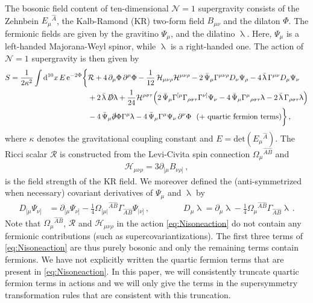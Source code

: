 \documentclass[a4paper,10pt,openany]{article}
\def\rme{\mathrm{e}}
\def\rmd{\mathrm{d}}
\begin{document}
	The bosonic field content of ten-dimensional $\mathcal{N}=1$ supergravity consists of the Zehnbein $E_\mu{}^{\hat A}$, the Kalb-Ramond (KR) two-form field $B_{\mu\nu}$ and the dilaton $\Phi$. The fermionic fields are given by the gravitino $\Psi_\mu$, and the dilatino $\uplambda$. Here, $\Psi_\mu$ is a left-handed Majorana-Weyl spinor, while $\uplambda$ is a right-handed one. The action of $\mathcal{N}=1$ supergravity is then given by
	\begin{align}
		\label{eq:Nisoneaction}
		S = \frac{1}{2\kappa^2}\int \rmd^{10}x\,E\,\rme^{-2\Phi}\bigg\{&\mathcal R+ 4\,\partial_\mu\Phi\,\partial^\mu\Phi - \frac{1}{12}\,\mathcal H_{\mu\nu\rho}\mathcal H^{\mu\nu\rho}-2\,\bar\Psi_\mu\Gamma^{\mu\nu\rho}D_\nu\Psi_\rho - 4\,\bar\uplambda\,\Gamma^{\mu\nu}D_\mu\Psi_\nu \notag\\
		& + 2\,\bar\uplambda\,\slashed D\uplambda +\frac{1}{24}\mathcal H^{\rho\sigma\tau}\Big(2\,\bar\Psi_\mu\Gamma^{[\mu}\Gamma_{\rho\sigma\tau}\Gamma^{\nu]}\Psi_\nu - 4\,\bar\Psi_\mu\Gamma^\mu{}_{\rho\sigma\tau}\uplambda - 2\,\bar\uplambda\,\Gamma_{\rho\sigma\tau}\uplambda\Big)\notag\\
		&-4\,\bar\Psi_\mu\slashed\partial\Phi\Gamma^\mu\uplambda - 4\,\bar{\Psi}_\mu\Gamma^\mu\Psi_\nu\,\partial^\nu\Phi \ \ ( + \text{ quartic fermion terms})\bigg\}\,,
	\end{align}
	where $\kappa$ denotes the gravitational coupling constant and $E = \mathrm{det}(E_\mu{}^{\hat{A}})$. The Ricci scalar $\mathcal{R}$ is constructed from the Levi-Civita spin connection $\Omega_\mu{}^{\hat{A}\hat{B}}$ and
	\begin{align}
		\label{eq:defH}
		\mathcal{H}_{\mu\nu\rho} = 3 \partial_{[\mu} B_{\nu\rho]} \,,
	\end{align}
	is the field strength of the KR field. We moreover defined the (anti-symmetrized when necessary) covariant derivatives of $\Psi_\mu$ and $\uplambda$ by
	\begin{align}
		D_{[\mu} \Psi_{\nu]} &= \partial_{[\mu} \Psi_{\nu]} - \frac14 \Omega_{[\mu|}{}^{\hat{A}\hat{B}} \Gamma_{\hat{A} \hat{B}} \Psi_{|\nu]} \,, \qquad \qquad D_\mu \uplambda = \partial_\mu \uplambda - \frac14 \Omega_{\mu}{}^{\hat{A}\hat{B}} \Gamma_{\hat{A} \hat{B}} \uplambda \,.
	\end{align}
	Note that $\Omega_\mu{}^{\hat{A}\hat{B}}$, $\mathcal{R}$ and $\mathcal{H}_{\mu\nu\rho}$ in the action \eqref{eq:Nisoneaction} do not contain any fermionic contributions (such as supercovariantizations). The first three terms of \eqref{eq:Nisoneaction} are thus purely bosonic and only the remaining terms contain fermions. We have not explicitly written the quartic fermion terms that are present in \eqref{eq:Nisoneaction}. In this paper, we will consistently truncate quartic fermion terms in actions and we will only give the terms in the supersymmetry transformation rules that are consistent with this truncation. %
	
\end{document}
